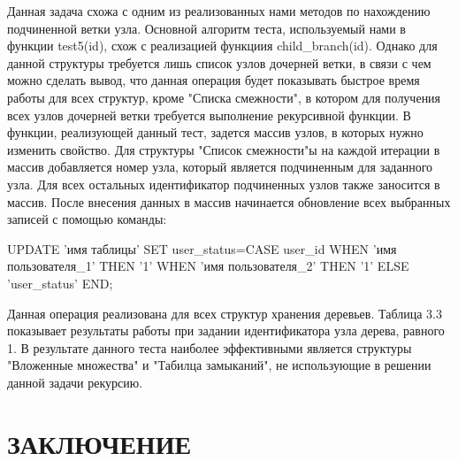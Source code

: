 \documentclass[a4paper,14pt]{extreport}
\theoremstyle{definition}
\begin{document}
Данная задача схожа с одним из реализованных нами методов по нахождению подчиненной ветки узла. Основной алгоритм теста, используемый нами в функции test5(\textdollar id), схож с реализацией функциия child\_branch(\textdollar id). Однако для данной структуры требуется лишь список узлов дочерней ветки, в связи с чем можно сделать вывод, что данная операция будет показывать быстрое время работы для всех структур, кроме "Списка смежности", в котором для получения всех узлов дочерней ветки требуется выполнение рекурсивной функции. В функции, реализующей данный тест, задется массив узлов, в которых нужно изменить свойство. Для структуры "Список смежности"ы на каждой итерации в массив добавляется номер узла, который является подчиненным для заданного узла. Для всех остальных идентификатор подчиненных узлов также заносится в массив. После внесения данных в массив начинается обновление всех выбранных записей с помощью команды:

UPDATE 'имя таблицы' SET user\_status=CASE user\_id WHEN 'имя пользователя\_1' THEN '1' WHEN 'имя пользователя\_2' THEN '1' ELSE 'user\_status' END;

Данная операция реализована для всех структур хранения деревьев. Таблица 3.3 показывает результаты работы при задании идентификатора узла дерева, равного 1. В результате данного теста наиболее эффективными является структуры "Вложенные множества" и "Табилца замыканий", не использующие в решении данной задачи рекурсию.
\begin{table}[H]
\end{table}

\chapter*{ЗАКЛЮЧЕНИЕ}
\end{document}
